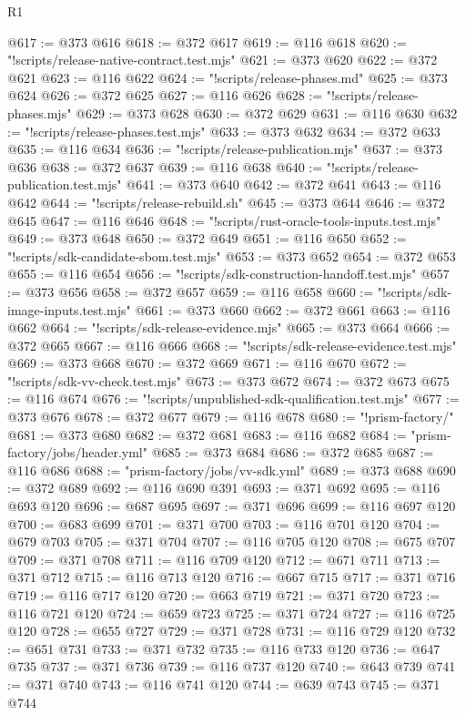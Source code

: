 \begin{lexlean}{R1}
\begin{coremodule}
@617 := @373 @616
@618 := @372 @617
@619 := @116 @618
@620 := "!scripts/release-native-contract.test.mjs"
@621 := @373 @620
@622 := @372 @621
@623 := @116 @622
@624 := "!scripts/release-phases.md"
@625 := @373 @624
@626 := @372 @625
@627 := @116 @626
@628 := "!scripts/release-phases.mjs"
@629 := @373 @628
@630 := @372 @629
@631 := @116 @630
@632 := "!scripts/release-phases.test.mjs"
@633 := @373 @632
@634 := @372 @633
@635 := @116 @634
@636 := "!scripts/release-publication.mjs"
@637 := @373 @636
@638 := @372 @637
@639 := @116 @638
@640 := "!scripts/release-publication.test.mjs"
@641 := @373 @640
@642 := @372 @641
@643 := @116 @642
@644 := "!scripts/release-rebuild.sh"
@645 := @373 @644
@646 := @372 @645
@647 := @116 @646
@648 := "!scripts/rust-oracle-tools-inputs.test.mjs"
@649 := @373 @648
@650 := @372 @649
@651 := @116 @650
@652 := "!scripts/sdk-candidate-sbom.test.mjs"
@653 := @373 @652
@654 := @372 @653
@655 := @116 @654
@656 := "!scripts/sdk-construction-handoff.test.mjs"
@657 := @373 @656
@658 := @372 @657
@659 := @116 @658
@660 := "!scripts/sdk-image-inputs.test.mjs"
@661 := @373 @660
@662 := @372 @661
@663 := @116 @662
@664 := "!scripts/sdk-release-evidence.mjs"
@665 := @373 @664
@666 := @372 @665
@667 := @116 @666
@668 := "!scripts/sdk-release-evidence.test.mjs"
@669 := @373 @668
@670 := @372 @669
@671 := @116 @670
@672 := "!scripts/sdk-vv-check.test.mjs"
@673 := @373 @672
@674 := @372 @673
@675 := @116 @674
@676 := "!scripts/unpublished-sdk-qualification.test.mjs"
@677 := @373 @676
@678 := @372 @677
@679 := @116 @678
@680 := "!prism-factory/"
@681 := @373 @680
@682 := @372 @681
@683 := @116 @682
@684 := "prism-factory/jobs/header.yml"
@685 := @373 @684
@686 := @372 @685
@687 := @116 @686
@688 := "prism-factory/jobs/vv-sdk.yml"
@689 := @373 @688
@690 := @372 @689
@692 := @116 @690 @391
@693 := @371 @692
@695 := @116 @693 @120
@696 := @687 @695
@697 := @371 @696
@699 := @116 @697 @120
@700 := @683 @699
@701 := @371 @700
@703 := @116 @701 @120
@704 := @679 @703
@705 := @371 @704
@707 := @116 @705 @120
@708 := @675 @707
@709 := @371 @708
@711 := @116 @709 @120
@712 := @671 @711
@713 := @371 @712
@715 := @116 @713 @120
@716 := @667 @715
@717 := @371 @716
@719 := @116 @717 @120
@720 := @663 @719
@721 := @371 @720
@723 := @116 @721 @120
@724 := @659 @723
@725 := @371 @724
@727 := @116 @725 @120
@728 := @655 @727
@729 := @371 @728
@731 := @116 @729 @120
@732 := @651 @731
@733 := @371 @732
@735 := @116 @733 @120
@736 := @647 @735
@737 := @371 @736
@739 := @116 @737 @120
@740 := @643 @739
@741 := @371 @740
@743 := @116 @741 @120
@744 := @639 @743
@745 := @371 @744

\end{coremodule}
\end{lexlean}
